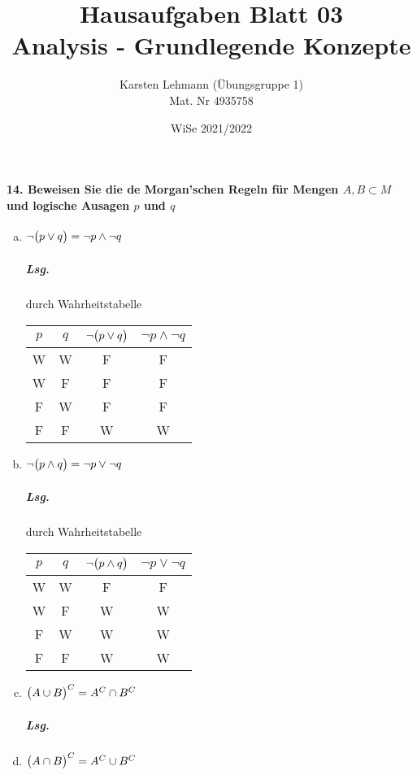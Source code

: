 \documentclass{scrreprt}
\author{Karsten Lehmann (Übungsgruppe 1)\\Mat. Nr 4935758}
\date{WiSe 2021/2022}
\title{Hausaufgaben Blatt 03\\Analysis - Grundlegende Konzepte}
\begin{document}
\paragraph{14. Beweisen Sie die de Morgan'schen Regeln
  für Mengen $A, B \subset M$ und logische Ausagen $p$ und $q$}

\begin{enumerate}[(a)]
\item $\neg \qty\big(p \lor q) = \neg p \land \neg q$
  \subparagraph{Lsg.} durch Wahrheitstabelle
  \begin{center}
    \begin{tabular}{c | c | c | c}
      $p$ & $q$ & $\neg \qty\big(p \lor q)$ & $\neg p \land \neg q$ \\
      \hline
      W & W & F & F \\
      W & F & F & F \\
      F & W & F & F \\
      F & F & W & W
    \end{tabular}
  \end{center}

\item $\neg \qty\big(p \land q) = \neg p \lor \neg q$

  \subparagraph{Lsg.} durch Wahrheitstabelle
  \begin{center}
    \begin{tabular}{c | c | c | c}
      $p$ & $q$ & $\neg \qty\big(p \land q)$ & $\neg p \lor \neg q$ \\
      \hline
      W & W & F & F \\
      W & F & W & W \\
      F & W & W & W \\
      F & F & W & W
    \end{tabular}
  \end{center}
\item $\qty\big(A \cup B)^C = A^C \cap B^C$

  \subparagraph{Lsg.}
\item $\qty\big(A \cap B)^C = A^C \cup B^C$


\end{enumerate}
\end{document}
